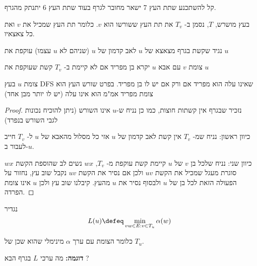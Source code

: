 קל להשתכנע שתת העץ 7 ישאר מחובר לגרף בעוד שתת העץ 6 יתנתק מהגרף.

בעץ מושרש, $T$, נסמן ב-%
$T_v$
את תת העץ ששורשו הוא $v$. כלומר תת העץ שמכיל את $v$ ואת כל צאצאיו.
\begin{definition}
נגיד שקשת בגרף מצאצא של $u$ לאב קדמון של $u$ (שניהם לא $u$ עצמו) עוקפת את $u$
\end{definition}

\begin{definition}[בן מפריד]
צומת $v$ עם אבא $u$ יקרא בן מפריד אם לא קיימת ב-%
$T_v$
קשת שעוקפת את $u$
\end{definition}
\begin{claim}
צומת $u$ בעץ DFS שאינו עלה הוא מפריד אם ורק אם  יש לו בן מפריד.
בפרט שורש העץ הוא צומת מפריד אמ"מ הוא אינו עלה (יש לו יותר מבן אחד)
\end{claim}
\begin{proof}
נזכיר שבגרף אין קשתות חוצות, כמו כן נניח ש-$u$ אינו השורש (ניתן להוכיח נכונות לגבי השורש בנפרד)

כיוון ראשון: נניח שמ-%
$T_v$
אין קשת לאב קדמון של $u$ אזי כל מסלול מהאבא של $u$ ל-%
$T_v$
חייב לעבור ב-$u$.

כיוון שני: נניח שלכל בן $v$ של $u$ קיימת קשת עוקפת מ-%
$T_v$,
$wx$
נשים לב שהוספת הקשת $wx$ סוגרת מעגל שמכיל את הקשת $uv$ ולכן אם נסיר את הקשת $uv$
נקבל שוב עץ, נחזור על הפעולה הזאת לכל בן של $u$ ולבסוף נסיר את $u$ מהעץ. 
קיבלנו שוב עץ ולכן $u$ אינו צומת הפרדה.

\end{proof}

\begin{definition}
נגדיר
$$
L(u) \defeq \min_{vw \in E: v \in T_u} \alpha(w)
$$
\end{definition}
כלומר הצומת עם ערך $\alpha$ מינימלי שהוא שכן של 
$T_u$.

\textbf{דוגמה:}
מה ערכי $L$ בגרף הבא ?
\begin{center}
\end{center}

